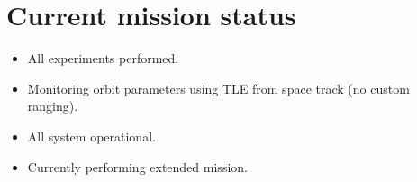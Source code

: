 \section{Current mission status}

\begin{itemize}    
 \item All experiments performed.
 \item Monitoring orbit parameters using TLE from space track (no custom ranging).
 \item All system operational.
 \item Currently performing extended mission.
\end{itemize}
